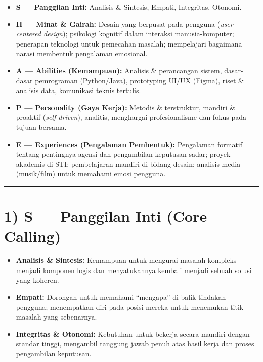 \documentclass[
  letterpaper,
  DIV=11,
  numbers=noendperiod]{scrreprt}
\providecommand{\tightlist}{%
  \setlength{\itemsep}{0pt}\setlength{\parskip}{0pt}}
\begin{document}
\begin{itemize}
\tightlist
\item
  \textbf{S --- Panggilan Inti:} Analisis \& Sintesis, Empati,
  Integritas, Otonomi.
\item
  \textbf{H --- Minat \& Gairah:} Desain yang berpusat pada pengguna
  (\emph{user-centered design}); psikologi kognitif dalam interaksi
  manusia-komputer; penerapan teknologi untuk pemecahan masalah;
  mempelajari bagaimana narasi membentuk pengalaman emosional.
\item
  \textbf{A --- Abilities (Kemampuan):} Analisis \& perancangan sistem,
  dasar-dasar pemrograman (Python/Java), prototyping UI/UX (Figma),
  riset \& analisis data, komunikasi teknis tertulis.
\item
  \textbf{P --- Personality (Gaya Kerja):} Metodis \& terstruktur,
  mandiri \& proaktif (\emph{self-driven}), analitis, menghargai
  profesionalisme dan fokus pada tujuan bersama.
\item
  \textbf{E --- Experiences (Pengalaman Pembentuk):} Pengalaman formatif
  tentang pentingnya agensi dan pengambilan keputusan sadar; proyek
  akademis di STI; pembelajaran mandiri di bidang desain; analisis media
  (musik/film) untuk memahami emosi pengguna.
\end{itemize}

\begin{center}\rule{0.5\linewidth}{0.5pt}\end{center}

\section{1) S --- Panggilan Inti (Core
Calling)}\label{s-panggilan-inti-core-calling}

\begin{itemize}
\tightlist
\item
  \textbf{Analisis \& Sintesis:} Kemampuan untuk mengurai masalah
  kompleks menjadi komponen logis dan menyatukannya kembali menjadi
  sebuah solusi yang koheren.
\item
  \textbf{Empati:} Dorongan untuk memahami ``mengapa'' di balik tindakan
  pengguna; menempatkan diri pada posisi mereka untuk menemukan titik
  masalah yang sebenarnya.
\item
  \textbf{Integritas \& Otonomi:} Kebutuhan untuk bekerja secara mandiri
  dengan standar tinggi, mengambil tanggung jawab penuh atas hasil kerja
  dan proses pengambilan keputusan.
\end{itemize}
\end{document}
